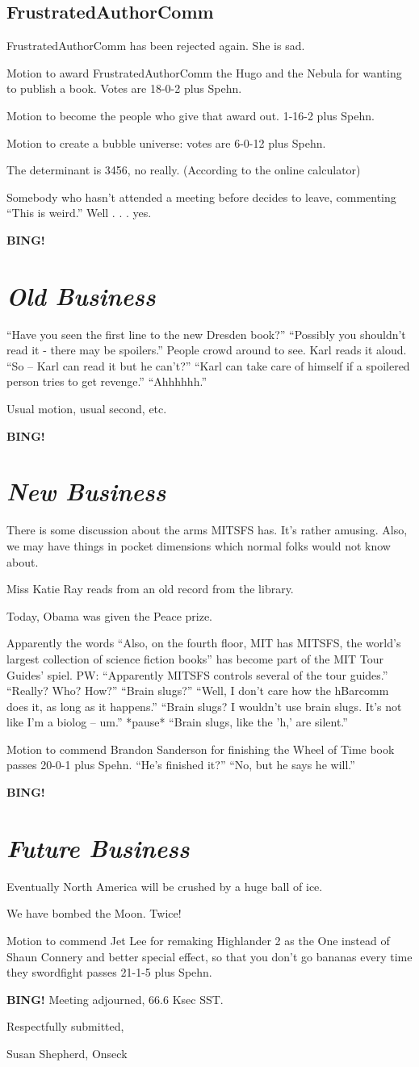 \documentclass[10pt]{article}
\newcommand{\bing}{{\bf BING!} }
\newcommand{\goto}[1]{\bing \vskip 12pt \section*{{\em{#1}}}}
\newcommand{\ps}{ plus Spehn\xspace}
\begin{document}
\subsection*{FrustratedAuthorComm}
FrustratedAuthorComm has been rejected again. She is sad.

Motion to award FrustratedAuthorComm the Hugo and the Nebula for wanting to publish a book. Votes are 18-0-2\ps.

Motion to become the people who give that award out. 1-16-2\ps.

Motion to create a bubble universe: votes are 6-0-12\ps.

The determinant is 3456, no really. (According to the online calculator)

Somebody who hasn't attended a meeting before decides to leave, commenting ``This is weird.'' Well . . . yes.

\goto{Old Business}

``Have you seen the first line to the new Dresden book?'' ``Possibly you shouldn't read it - there may be spoilers.'' People crowd around to see. Karl reads it aloud. ``So -- Karl can read it but he can't?'' ``Karl can take care of himself if a spoilered person tries to get revenge.'' ``Ahhhhhh.''

Usual motion, usual second, etc.

\goto{New Business}

There is some discussion about the arms MITSFS has. It's rather amusing. Also, we may have things in pocket dimensions which normal folks would not know about.

Miss Katie Ray reads from an old record from the library.

Today, Obama was given the Peace prize.

Apparently the words ``Also, on the fourth floor, MIT has MITSFS, the world's largest collection of science fiction books'' has become part of the MIT Tour Guides' spiel. PW: ``Apparently MITSFS controls several of the tour guides.'' ``Really? Who? How?'' ``Brain slugs?''  ``Well, I don't care how the hBarcomm does it,
as long as it happens.'' ``Brain slugs? I wouldn't use brain slugs. It's not like I'm a biolog -- um.'' *pause* ``Brain slugs, like the 'h,' are silent.''

Motion to commend Brandon Sanderson for finishing the Wheel of Time book passes 20-0-1\ps. ``He's finished it?'' ``No, but he says he will.''

\goto{Future Business}

Eventually North America will be crushed by a huge ball of ice.

We have bombed the Moon. Twice!

Motion to commend Jet Lee for remaking Highlander 2 as the One instead of Shaun Connery and better special effect, so that you don't go bananas every time they swordfight passes 21-1-5\ps.

\bing
\noindent
Meeting adjourned, 66.6 Ksec SST.

\vspace{18pt}

\centerline{Respectfully submitted,}
\centerline{Susan Shepherd, Onseck}
\end{document}
